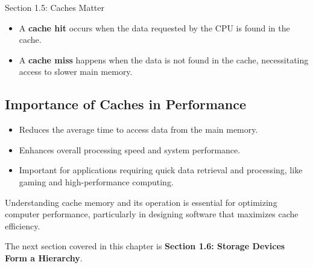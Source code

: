\begin{notes}{Section 1.5: Caches Matter}
    \begin{itemize}
        \item A \textbf{cache hit} occurs when the data requested by the CPU is found in the cache.
        \item A \textbf{cache miss} happens when the data is not found in the cache, necessitating access to slower main memory.
    \end{itemize}
    
    \subsection*{Importance of Caches in Performance}

    \begin{itemize}
        \item Reduces the average time to access data from the main memory.
        \item Enhances overall processing speed and system performance.
        \item Important for applications requiring quick data retrieval and processing, like gaming and high-performance computing.
    \end{itemize}
    
    Understanding cache memory and its operation is essential for optimizing computer performance, particularly in designing software that maximizes cache efficiency.    
\end{notes}

The next section covered in this chapter is \textbf{Section 1.6: Storage Devices Form a Hierarchy}.

